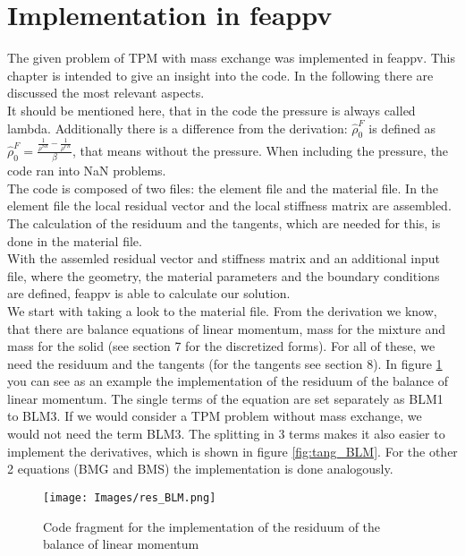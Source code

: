 \documentclass[12pt]{article}
\begin{document}
\section{\huge{Implementation in feappv}}

The given problem of TPM with mass exchange was implemented in feappv. This chapter is intended to give an insight into the code. In the following there are discussed the most relevant aspects. \\
It should be mentioned here, that in the code the pressure is always called lambda. Additionally there is a difference from the derivation: $\hat{\rho}_{0}^{F}$ is defined as $\hat{\rho}_{0}^{F} = \frac{\frac{1}{\rho^{SR}}-\frac{1}{\rho^{FR}}}{\beta}$, that means without the pressure. When including the pressure, the code ran into NaN problems.\\

The code is composed of two files: the element file and the material file. In the element file the local residual vector and the local stiffness matrix are assembled. The calculation of the residuum and the tangents, which are needed for this, is done in the material file. \\
With the assemled residual vector and stiffness matrix and an additional input file, where the geometry, the material parameters and the boundary conditions are defined, feappv is able to calculate our solution. \\ 

We start with taking a look to the material file. From the derivation we know, that there are balance equations of linear momentum, mass for the mixture and mass for the solid (see section 7 for the discretized forms). For all of these, we need the residuum and the tangents (for the tangents see section 8). In figure \ref{fig:res_BLM} you can see as an example the implementation of the residuum of the balance of linear momentum. The single terms of the equation are set separately as BLM1 to BLM3. If we would consider a TPM problem without mass exchange, we would not need the term BLM3. The splitting in 3 terms makes it also easier to implement the derivatives, which is shown in figure \ref{fig:tang_BLM}. For the other 2 equations (BMG and BMS) the implementation is done analogously. \\

\begin{figure}[H]
	\centering
	\texttt{[image: Images/res\_BLM.png]}
	\caption{Code fragment for the implementation of the residuum of the balance of linear momentum}
	\label{fig:res_BLM}
\end{figure}
\end{document}
